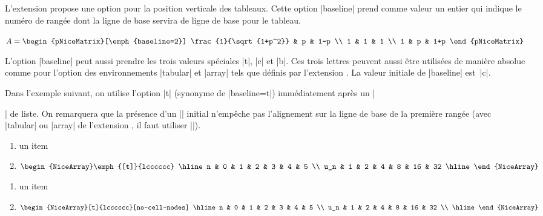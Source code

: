 \documentclass[dvipsnames]{article}
\newcommand{\interitem}{\vspace{7mm plus 2mm minus 3mm}}
\begin{document}

L'extension  propose une option  pour la
position verticale des tableaux. Cette option |baseline| prend comme valeur un
entier qui indique le numéro de rangée dont la ligne de base servira de ligne de
base pour le tableau.

\medskip
\begin{Code}[width=9cm,show-output,no-cell-nodes]
$A = \begin{pNiceMatrix}[\emph{baseline=2}]
\frac{1}{\sqrt{1+p^2}} & p & 1-p \\
1 & 1 & 1 \\
1 & p & 1+p
\end{pNiceMatrix}$
\end{Code}


\interitem L'option |baseline| peut aussi prendre les trois valeurs spéciales
|t|, |c| et |b|. Ces trois lettres peuvent aussi être utilisées de manière
absolue comme pour l'option des environnements |{tabular}| et |{array}| tels que définis
par l'extension . La valeur initiale de |baseline| est~|c|.


\medskip
Dans l'exemple suivant, on utilise l'option |t| (synonyme de |baseline=t|)
immédiatement après un |\item| de liste. On remarquera que la présence d'un
|\hline| initial n'empêche pas l'alignement sur la ligne de base de la première
rangée (avec |{tabular}| ou |{array}| de l'extension , il faut utiliser
|\firsthline|).



\smallskip
\begin{Code}[width=9cm]
\begin{enumerate}
\item un item
\smallskip
\item \renewcommand{\arraystretch}{1.2}
$\begin{NiceArray}\emph{[t]}{lcccccc}
\hline
n   & 0 & 1 & 2 & 3 & 4  & 5 \\
u_n & 1 & 2 & 4 & 8 & 16 & 32
\hline
\end{NiceArray}$
\end{enumerate}
\end{Code}
%
\begin{minipage}{5cm}
\begin{enumerate}
\item un item
\smallskip
\item \renewcommand{\arraystretch}{1.2}
$\begin{NiceArray}[t]{lcccccc}[no-cell-nodes]
\hline
n   & 0 & 1 & 2 & 3 & 4  & 5  \\
u_n & 1 & 2 & 4 & 8 & 16 & 32 \\
\hline
\end{NiceArray}$
\end{enumerate}
\end{minipage}
\end{document}
